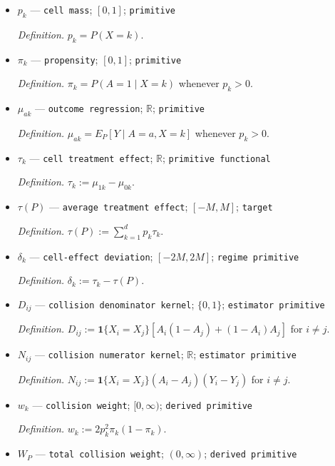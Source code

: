 \documentclass{article}
\begin{document}
\begin{itemize}
  \par\smallskip\noindent\emph{Definition.} \(Q_P^{(n)}:=P_O^{\otimes n}\), the law under which \(O_1,\ldots,O_n\) are independent with common law \(P_O\).
  \item \(p_k\) --- \texttt{cell mass}; \([0,1]\); \texttt{primitive}
  \par\smallskip\noindent\emph{Definition.} \(p_k=P(X=k)\).
  \item \(\pi_k\) --- \texttt{propensity}; \([0,1]\); \texttt{primitive}
  \par\smallskip\noindent\emph{Definition.} \(\pi_k=P(A=1\mid X=k)\) whenever \(p_k>0\).
  \item \(\mu_{ak}\) --- \texttt{outcome regression}; \(\mathbb R\); \texttt{primitive}
  \par\smallskip\noindent\emph{Definition.} \(\mu_{ak}=E_P[Y\mid A=a,X=k]\) whenever \(p_k>0\).
  \item \(\tau_k\) --- \texttt{cell treatment effect}; \(\mathbb R\); \texttt{primitive functional}
  \par\smallskip\noindent\emph{Definition.} \(\tau_k:=\mu_{1k}-\mu_{0k}\).
  \item \(\tau(P)\) --- \texttt{average treatment effect}; \([-M,M]\); \texttt{target}
  \par\smallskip\noindent\emph{Definition.} \(\tau(P):=\sum_{k=1}^{d}p_k\tau_k\).
  \item \(\delta_k\) --- \texttt{cell-\allowbreak{}effect deviation}; \([-2M,2M]\); \texttt{regime primitive}
  \par\smallskip\noindent\emph{Definition.} \(\delta_k:=\tau_k-\tau(P)\).
  \item \(D_{ij}\) --- \texttt{collision denominator kernel}; \(\{0,1\}\); \texttt{estimator primitive}
  \par\smallskip\noindent\emph{Definition.} \(D_{ij}:=\mathbf 1\{X_i=X_j\}[A_i(1-A_j)+(1-A_i)A_j]\) for \(i\ne j\).
  \item \(N_{ij}\) --- \texttt{collision numerator kernel}; \(\mathbb R\); \texttt{estimator primitive}
  \par\smallskip\noindent\emph{Definition.} \(N_{ij}:=\mathbf 1\{X_i=X_j\}(A_i-A_j)(Y_i-Y_j)\) for \(i\ne j\).
  \item \(w_k\) --- \texttt{collision weight}; \([0,\infty)\); \texttt{derived primitive}
  \par\smallskip\noindent\emph{Definition.} \(w_k:=2p_k^2\pi_k(1-\pi_k)\).
  \item \(W_P\) --- \texttt{total collision weight}; \((0,\infty)\); \texttt{derived primitive}

\end{itemize}
\end{document}

